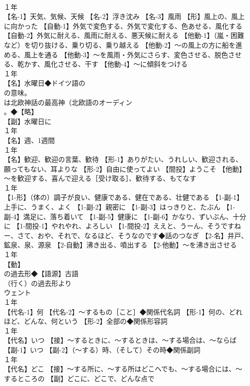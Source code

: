 \documentclass[8pt]{extreport}
\begin{document}
\begin{CJK}{UTF8}{min}
\\	１年	
\\	【名-1】天気、気候、天候 【名-2】浮き沈み 【名-3】風雨 【形】風上の、風上に向かった 【自動-1】外気で変色する、外気で変化する、色あせる、風化する 【自動-2】外気に耐える、風雨に耐える、悪天候に耐える 【他動-1】（嵐・困難など）を切り抜ける、乗り切る、乗り越える 【他動-2】～の風上の方に船を進める、風上を通る 【他動-3】～を風雨・外気にさらす、変色させる、脱色させる、乾かす、風化させる、干す 【他動-4】～に傾斜をつける
\\	１年	
\\	【名】水曜日◆ドイツ語の
\\	の意味。
\\	は北欧神話の最高神（北欧語のオーディン
\\	。◆【略】
\\	【副】水曜日に
\\	１年	
\\	【名】週、1週間
\\	１年	
\\	【名】歓迎、歓迎の言葉、歓待 【形-1】ありがたい、うれしい、歓迎される、願ってもない、耳よりな 【形-2】自由に使ってよい 【間投】ようこそ 【他動】～を歓迎する、喜んで迎える［受け取る］、歓待する、もてなす
\\	１年	
\\	【1-形】（体の）調子が良い、健康である、健在である、壮健である 【1-副-1】上手に、うまく、よく 【1-副-2】親密に 【1-副-3】はっきりと、たぶん 【1-副-4】満足に、落ち着いて 【1-副-5】健康に 【1-副-6】かなり、ずいぶん、十分に 【1-間投-1】やれやれ、よろしい 【1-間投-2】ええと、うーん、そうですねー、さて、おや、それで、なるほど、そうなのです◆話のつなぎ 【2-名】井戸、鉱泉、泉、源泉 【2-自動】沸き出る、噴出する 【2-他動】～を沸き出させる
\\	１年	
\\	【動】
\\	の過去形◆【語源】古語 
\\	（行く）の過去形より 
\\	ウェント
\\	１年	
\\	【代名-1】何 【代名-2】～するもの［こと］◆関係代名詞 【形-1】何の、どれほど、どんな、何という 【形-2】全部の◆関係形容詞
\\	１年	
\\	【代名】いつ 【接】～するときに、～するときは、～する場合は、～ならば 【副-1】いつ 【副-2】（～する）時、（そして）その時◆関係副詞
\\	１年	
\\	【代名】どこ 【接】～する所に、～する所はどこへでも、～する場合には、～するところの 【副】どこに、どこで、どんな点で

\end{CJK}
\end{document}
